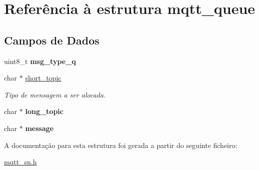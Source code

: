\hypertarget{structmqtt__queue}{\section{Referência à estrutura mqtt\+\_\+queue}
\label{structmqtt__queue}
}
\subsection*{Campos de Dados}
{\bf }\par
\begin{DoxyCompactItemize}
\item 
\hypertarget{structmqtt__queue_a6b9a925f3adb717097ee92e90a19a5c8}{uint8\+\_\+t {\bfseries msg\+\_\+type\+\_\+q}}\label{structmqtt__queue_a6b9a925f3adb717097ee92e90a19a5c8}

\item 
\hypertarget{structmqtt__queue_a75e6d191d497aacc32c9dfed069e19bb}{char $\ast$ \hyperlink{structmqtt__queue_a75e6d191d497aacc32c9dfed069e19bb}{short\+\_\+topic}}\label{structmqtt__queue_a75e6d191d497aacc32c9dfed069e19bb}

\begin{DoxyCompactList}\small\item\em Tipo de mensagem a ser alocada. \end{DoxyCompactList}\item 
\hypertarget{structmqtt__queue_a386cd08f6346e174279a8ca2f17c61c8}{char $\ast$ {\bfseries long\+\_\+topic}}\label{structmqtt__queue_a386cd08f6346e174279a8ca2f17c61c8}

\item 
\hypertarget{structmqtt__queue_a0b2e8c7f76df48129f994ecc46d5c66c}{char $\ast$ {\bfseries message}}\label{structmqtt__queue_a0b2e8c7f76df48129f994ecc46d5c66c}

\end{DoxyCompactItemize}



A documentação para esta estrutura foi gerada a partir do seguinte ficheiro\+:\begin{DoxyCompactItemize}
\item 
\hyperlink{mqtt__sn_8h}{mqtt\+\_\+sn.\+h}\end{DoxyCompactItemize}
